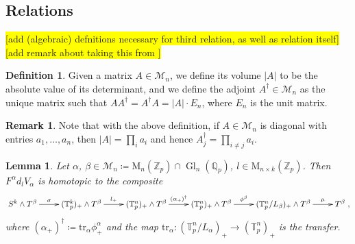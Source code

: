 \documentclass[10pt, a4paper, UKenglish]{article}
\numberwithin{equation}{section}
\newcommand{\cM}{\mathcal{M}}
\newcommand{\bQ}{\mathbb{Q}}
\newcommand{\bZ}{\mathbb{Z}}
\newcommand{\sT}{\mathbb{T}}		%
\newcommand{\defas}{\coloneqq}  %
\newcommand{\abs}[1]{\left\vert#1\right\vert}	%
\newcommand{\tr}{\mathrm{tr}}
\newcommand{\M}{\mathrm{M}}
\newcommand{\Gl}{\operatorname{Gl}}
\newcommand{\comm}[1]{\colorbox{yellow}{#1}}
\theoremstyle{plain}
\newtheorem{lem}[equation]{Lemma}
\theoremstyle{definition}
\newtheorem{defn}[equation]{Definition}
\newtheorem{rem}[equation]{Remark}
\renewcommand{\to}{\longrightarrow}
\begin{document}
\subsection{Relations}
%
\comm{[add (algebraic) defnitions necessary for third relation, as well as relation itself]}\\
\comm{[add remark about taking this from \cite{carlsson2011higher}]}
\begin{defn}
Given a matrix $A \in \cM_n$, we define its volume $\abs{A}$ to be the absolute value of its determinant, and we define the adjoint $A^\dagger \in \cM_n$ as the unique matrix such that $A A^\dagger = A^\dagger A = \abs{A} \cdot E_n$, where $E_n$ is the unit matrix.
\end{defn}
%
%
\begin{rem}
Note that with the above definition, if $A \in \cM_n$ is diagonal with entries $a_1, \ldots, a_n$, then $\abs{A} = \prod_i a_i$ and hence $A^\dagger_j = \prod_{i \neq j} a_i$.
\end{rem}
%
%
\begin{lem}\cite[Lemma 3.17]{carlsson2011higher}
Let $\alpha$, $\beta \in \cM_n \defas \M_n(\bZ_p) \cap \Gl_n(\bQ_p)$, $l \in \M_{n \times k}(\bZ_p)$. Then $F^\alpha d_l V_\alpha$ is homotopic to the composite
$$\begin{xy}
\xymatrix{
  S^k \wedge T^\beta \ar[r]^-{\sigma} &%
  (\sT^k_p)_+ \wedge T^\beta \ar[r]^-{l_+} &%
  (\sT^n_p)_+ \wedge T^\beta \ar[r]^-{(\alpha_+)^\dagger} &%
  (\sT^n_p)_+ \wedge T^\beta \ar[r]^-{\phi^\beta} &%
  (\sT^n_p/L_\beta)_+ \wedge T^\beta \ar[r]^-{\mu} &%
  T^\beta
  }%
\end{xy},$$
where $(\alpha_+)^\dagger \defas \tr_\alpha\phi^\alpha_+$ and the map $\tr_\alpha: (\sT^n_p/L_\alpha)_+ \to (\sT^n_p)_+$ is the transfer.
\end{lem}
%
%
\end{document}
